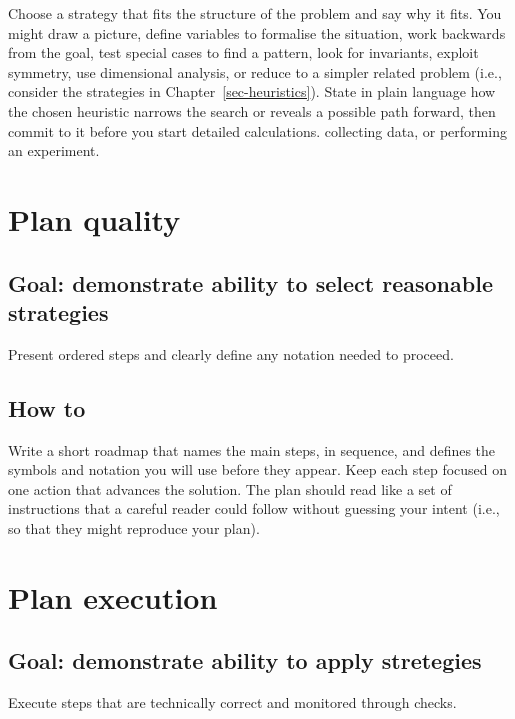 \documentclass[
  a4paper,
  DIV=11,
  numbers=noendperiod,
  oneside]{scrreprt}
\begin{document}
Choose a strategy that fits the structure of the problem and say why it
fits. You might draw a picture, define variables to formalise the
situation, work backwards from the goal, test special cases to find a
pattern, look for invariants, exploit symmetry, use dimensional
analysis, or reduce to a simpler related problem (i.e., consider the
strategies in Chapter~\ref{sec-heuristics}). State in plain language how
the chosen heuristic narrows the search or reveals a possible path
forward, then commit to it before you start detailed calculations.
collecting data, or performing an experiment.

\section{Plan quality}\label{plan-quality}

\subsection{Goal: demonstrate ability to select reasonable
strategies}\label{goal-demonstrate-ability-to-select-reasonable-strategies}

Present ordered steps and clearly define any notation needed to proceed.

\subsection{How to}\label{how-to-2}

Write a short roadmap that names the main steps, in sequence, and
defines the symbols and notation you will use before they appear. Keep
each step focused on one action that advances the solution. The plan
should read like a set of instructions that a careful reader could
follow without guessing your intent (i.e., so that they might reproduce
your plan).

\section{Plan execution}\label{plan-execution}

\subsection{Goal: demonstrate ability to apply
stretegies}\label{goal-demonstrate-ability-to-apply-stretegies}

Execute steps that are technically correct and monitored through checks.
\end{document}
